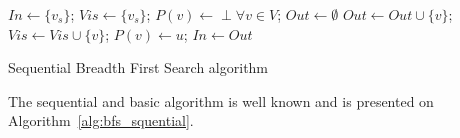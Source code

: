\begin{algorithm}

\begin{algorithmic}[1]
\State $In \gets \{v_s\}$;
\State $Vis \gets \{v_s\}$;
\State $P(v) \gets \perp \forall v \in V$;
	\State $Out \gets \emptyset$
				\State $Out \leftarrow Out \cup \{v\}$;
				\State $Vis \gets Vis \cup \{v\}$;
				\State $P(v) \leftarrow u$;
			\EndIf
		\EndFor
	\EndFor
	\State $In \gets Out$
\EndWhile
\EndFunction
\end{algorithmic}
\caption{Sequential Breadth First Search algorithm}
\label{alg:bfs_squential}
\end{algorithm}

The sequential and basic algorithm is well known and is presented on Algorithm~\ref{alg:bfs_squential}.

